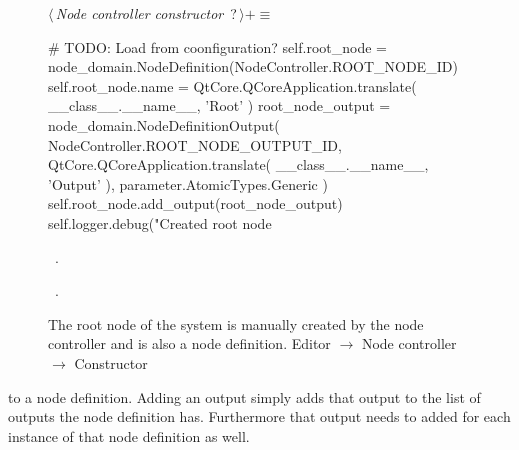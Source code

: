 \documentclass[%
    a4paper,    %
    justified,  %
    nobib,      %
    openany     %
]{tufte-book}
\makeatletter
\renewcommand{\label}[1]{\@tufte@label{##1}}%
\makeatother
\begin{document}
\begin{figure}
\begin{flushleft} \small
\begin{minipage}{\linewidth}\label{scrap142}\raggedright\small
{} $\langle\,${\itshape Node controller constructor}\nobreak\ {\footnotesize {?}}$\,\rangle+\equiv$
\vspace{-1ex}
\begin{pythoncode}
    # TODO: Load from coonfiguration?
    self.root_node = node_domain.NodeDefinition(NodeController.ROOT_NODE_ID)
    self.root_node.name = QtCore.QCoreApplication.translate(
        __class__.__name__,
        'Root'
    )
    root_node_output = node_domain.NodeDefinitionOutput(
        NodeController.ROOT_NODE_OUTPUT_ID,
        QtCore.QCoreApplication.translate(
            __class__.__name__,
            'Output'
        ),
        parameter.AtomicTypes.Generic
    )
    self.root_node.add_output(root_node_output)
    self.logger.debug("Created root node %
\end{pythoncode}
\vspace{1.5ex}
\footnotesize
\begin{list}{}{\setlength{\itemsep}{-\parsep}\setlength{\itemindent}{-\leftmargin}}
\item \NWtxtMacroDefBy\ .
\item \NWtxtMacroRefIn\ .

\item{}
\end{list}
\end{minipage}\vspace{4ex}
\end{flushleft}
\caption{The root node of the system is manually created by the node controller
  and is also a node definition.
  \newline{}\newline{}Editor $\rightarrow$ Node controller $\rightarrow$
  Constructor}
\label{editor:lst:node-controller:constructor:add-root-node}
\end{figure}

 to a node
definition. Adding an output simply adds that output to the list of outputs the
node definition has. Furthermore that output needs to added for each instance of
that node definition as well. 
\end{document}
